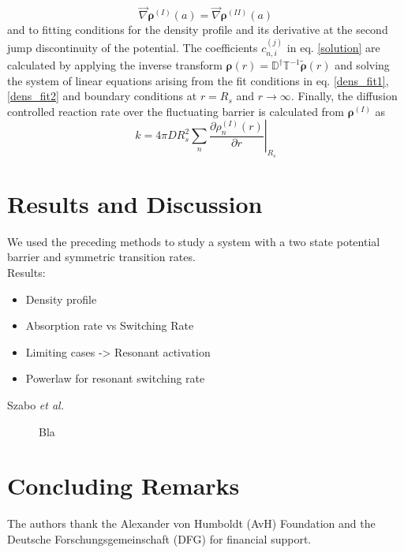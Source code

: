 \documentclass[twocolumn,superscriptaddress]{revtex4}
\newcommand{\vect}[1]{\boldsymbol{\mathbf{#1}}}
\begin{document}
\begin{equation}
    \vec{\nabla}\vect{\rho}^{(I)}(a) =\vec{\nabla}\vect{\rho}^{(II)}(a) 
    \label{dens_fit2}
\end{equation}
and to fitting conditions for the density profile and its derivative at the second jump discontinuity of the potential.
The coefficients $c_{n,i}^{(j)}$ in eq. \eqref{solution} are calculated by applying the inverse transform $\vect{\rho}(r) = \mathbb{D}^{\dagger}\mathbb{T}^{-1}\tilde{\vect{\rho}}(r)$ and solving the system of linear equations arising from the fit conditions in eq. \eqref{dens_fit1}, \eqref{dens_fit2} and boundary conditions at $r=R_s$ and $r \rightarrow \infty$. Finally, the diffusion controlled reaction rate over the fluctuating barrier is calculated from $\vect{\rho}^{(I)}$ as
\begin{equation}
    k = 4 \pi D R_s^{2}\sum_n \left. \frac{\partial \rho_n^{(I)}(r)}{\partial r} \right|_{R_s}
    \label{rate_konstant}
\end{equation}
\section{Results and Discussion}
We used the preceding methods to study a system with a two state potential barrier and symmetric transition rates.\\
Results:
\begin{itemize}
    \item Density profile
    \item Absorption rate vs Switching Rate
    \item Limiting cases -> Resonant activation
    \item Powerlaw for resonant switching rate
\end{itemize}
Szabo {\it et al.}~\cite{Szabo1982}

\begin{figure}[h]
\caption{Bla}
\label{fig1}
\end{figure}


\section{Concluding Remarks}

\acknowledgments
The authors thank the Alexander von Humboldt (AvH) Foundation and the Deutsche Forschungsgemeinschaft (DFG) 
for financial support. 


\end{document}
